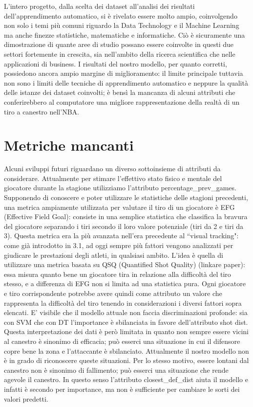 L’intero progetto, dalla scelta dei dataset all’analisi dei risultati dell’apprendimento automatico, si è rivelato essere molto ampio, coinvolgendo non solo i temi più comuni riguardo la Data Technology e il Machine Learning ma anche finezze statistiche, matematiche e informatiche. Ciò è sicuramente una dimostrazione di quante aree di studio possano essere coinvolte in questi due settori fortemente in crescita, sia nell’ambito della ricerca scientifica che nelle applicazioni di business.
I risultati del nostro modello, per quanto corretti, possiedono ancora ampio margine di miglioramento: il limite principale tuttavia non sono i limiti delle tecniche di apprendimento automatico e neppure la qualità delle istanze dei dataset coinvolti; è bensì la mancanza di alcuni attributi che conferirebbero al computatore una migliore rappresentazione della realtà di un tiro a canestro nell’NBA.
\section{Metriche mancanti}
Alcuni sviluppi futuri riguardano un diverso sottoinsieme di attributi da considerare.
Attualmente per stimare l’effettivo stato fisico e mentale del giocatore durante la stagione utilizziamo l’attributo percentage\_prev\_games. Supponendo di conoscere e poter utilizzare le statistiche delle stagioni precedenti, una metrica ampiamente utilizzata per valutare il tiro di un giocatore è EFG (Effective Field Goal): consiste in una semplice statistica che classifica la bravura del giocatore separando i tiri secondo il loro valore potenziale (tiri da 2 e tiri da 3).
Questa metrica era la più avanzata nell’era precedente al “visual tracking": come già introdotto in 3.1, ad oggi sempre più fattori vengono analizzati per giudicare le prestazioni degli atleti, in qualsiasi ambito.
L’idea è quella di utilizzare una metrica basata su QSQ (Quantified Shot Quality) (linkare paper): essa misura quanto bene un giocatore tira in relazione alla difficoltà del tiro stesso, e a differenza di EFG non si limita ad una statistica pura.
Ogni giocatore e tiro corrispondente potrebbe avere quindi come attributo un valore che rappresenta la difficoltà del tiro tenendo in considerazioni i diversi fattori sopra elencati.
E’ visibile che il modello attuale non faccia discriminazioni profonde: sia con SVM che con DT l’importance è sbilanciata in favore dell’attributo shot dist. Questa interpretazione dei dati è però limitata in quanto non sempre essere vicini al canestro è sinonimo di efficacia; può esserci una situazione in cui il difensore copre bene la zona e l’attaccante è sbilanciato. Attualmente il nostro modello non è in grado di riconoscere queste situazioni. Per lo stesso motivo, essere lontani dal canestro non è sinonimo di fallimento; può esserci una situazione che rende agevole il canestro.
In questo senso l’attributo closest\_def\_dist aiuta il modello e infatti è secondo per importance, ma non è sufficiente per cambiare le sorti dei valori predetti.

